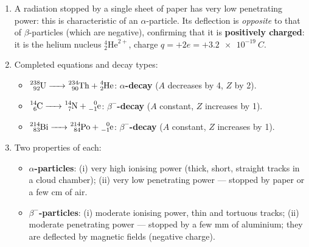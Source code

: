 \documentclass[11pt]{article}
\newcommand{\cle}[1]{{\popxbold\color{popdark}#1}}
\begin{document}
\begin{corrige}
\begin{enumerate}
    \item A radiation stopped by a single sheet of paper has very low penetrating power: this is characteristic of an \cle{$\alpha$-particle}. Its deflection is \emph{opposite} to that of $\beta$-particles (which are negative), confirming that it is \textbf{positively charged}: it is the helium nucleus $^{4}_{2}\mathrm{He}^{2+}$, charge $q = +2e = +\SI{3.2e-19}{C}$.
    \item Completed equations and decay types:
    \begin{itemize}
        \item $\ce{^{238}_{92}U -> ^{234}_{90}Th + ^{4}_{2}He}$: \textbf{$\alpha$-decay} ($A$ decreases by 4, $Z$ by 2).
        \item $\ce{^{14}_{6}C -> ^{14}_{7}N + ^{0}_{-1}e}$: \textbf{$\beta^{-}$-decay} ($A$ constant, $Z$ increases by 1).
        \item $\ce{^{214}_{83}Bi -> ^{214}_{84}Po + ^{0}_{-1}e}$: \textbf{$\beta^{-}$-decay} ($A$ constant, $Z$ increases by 1).
    \end{itemize}
    \item Two properties of each:
    \begin{itemize}
        \item \textbf{$\alpha$-particles}: (i) very high ionising power (thick, short, straight tracks in a cloud chamber); (ii) very low penetrating power — stopped by paper or a few cm of air.
        \item \textbf{$\beta^{-}$-particles}: (i) moderate ionising power, thin and tortuous tracks; (ii) moderate penetrating power — stopped by a few mm of aluminium; they are deflected by magnetic fields (negative charge).
    \end{itemize}
\end{enumerate}
\end{corrige}
\end{document}
